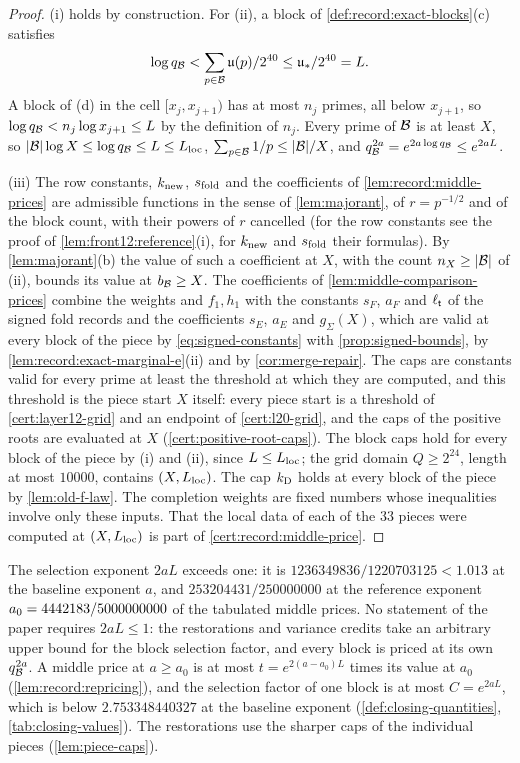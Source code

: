 \begin{proof}
(i) holds by construction. For (ii), a block of
\cref{def:record:exact-blocks}(c) satisfies
\[
 \log q_{\mathcal B}<\sum_{p\in\mathcal B}\mathfrak u(p)/2^{40}\le\mathfrak u_*/2^{40}=L .
\]
A block of (d) in the cell $[x_j,x_{j+1})$ has at most $n_j$ primes, all
below $x_{j+1}$, so $\log q_{\mathcal B}<n_j\log x_{j+1}\le L$ by the definition of
$n_j$. Every prime of $\mathcal B$ is at least $X$, so
$|\mathcal B|\log X\le\log q_{\mathcal B}\le L\le L_{\rm loc}$,
$\sum_{p\in\mathcal B}1/p\le|\mathcal B|/X$, and
$q_{\mathcal B}^{2a}=e^{2a\log q_{\mathcal B}}\le e^{2aL}$.

(iii) The row constants, $k_{\rm new}$, $s_{\rm fold}$ and the coefficients of
\cref{lem:record:middle-prices} are admissible functions in the sense of
\cref{lem:majorant}, of $r=p^{-1/2}$ and of the block count, with their powers
of $r$ cancelled (for the row constants see the proof of
\cref{lem:front12:reference}(i), for $k_{\rm new}$ and $s_{\rm fold}$ their
formulas). By \cref{lem:majorant}(b) the value of such a coefficient at $X$,
with the count $n_X\ge|\mathcal B|$ of (ii), bounds its value at $b_{\mathcal B}\ge X$. The
coefficients of \cref{lem:middle-comparison-prices} combine the weights and
$f_1,h_1$ with the constants $s_F$, $a_F$ and $\ell_{\mathsf t}$ of the signed fold
records and the coefficients $s_E$, $a_E$ and $g_\Sigma(X)$, which are valid at
every block of the piece by \eqref{eq:signed-constants} with
\cref{prop:signed-bounds}, by \cref{lem:record:exact-marginal-e}(ii) and by
\cref{cor:merge-repair}. The caps
are constants valid for every prime at least the threshold at which they are
computed, and this threshold is the piece start $X$ itself: every piece start
is a threshold of \cref{cert:layer12-grid} and an endpoint of
\cref{cert:l20-grid}, and the caps of the positive roots are evaluated at $X$
(\cref{cert:positive-root-caps}). The block caps hold for every block of the
piece by (i) and (ii), since $L\le L_{\rm loc}$; the grid domain $Q\ge2^{24}$,
length at most $10000$, contains $(X,L_{\rm loc})$. The cap $k_{\rm D}$ holds
at every block of the piece by \cref{lem:old-f-law}. The completion weights are
fixed numbers whose inequalities involve only these inputs. That the local data
of each of the $33$ pieces were computed at $(X,L_{\rm loc})$ is part of
\cref{cert:record:middle-price}.
\end{proof}

The selection exponent $2aL$ exceeds one: it is
$1236349836/1220703125<1.013$ at the baseline exponent $a$, and
$253204431/250000000$ at the reference exponent $a_0=4442183/5000000000$ of the tabulated
middle prices. No statement of the paper requires $2aL\le1$: the restorations
and variance credits take an arbitrary upper bound for the block selection
factor, and every block is priced at its own $q_{\mathcal B}^{2a}$. A middle price at
$a\ge a_0$ is at most $t=e^{2(a-a_0)L}$ times its value at $a_0$
(\cref{lem:record:repricing}), and the selection factor of one block is at most
$C=e^{2aL}$, which is below $2.753348440327$ at the baseline exponent (\cref{def:closing-quantities},
\cref{tab:closing-values}). The restorations use the sharper caps of the
individual pieces (\cref{lem:piece-caps}).

